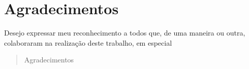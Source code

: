 \thispagestyle{plain}

\section*{Agradecimentos}

\noindent Desejo expressar meu reconhecimento a todos que, de uma maneira ou outra, colaboraram na realização deste trabalho, em especial

\begin{quote}
  Agradecimentos
\end{quote}

\cleardoublepageempty
